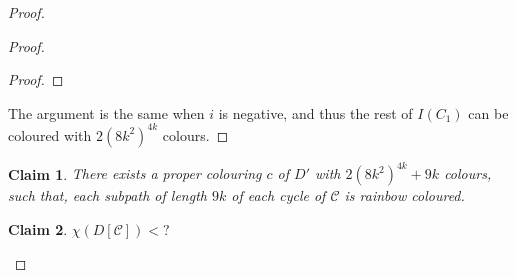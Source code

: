 \documentclass[utf8,10pt]{article}
\theoremstyle{plain}
\newtheorem{claim}{Claim}[theorem]
\theoremstyle{definition}
\theoremstyle{remark}
\begin{document}
\begin{proof}
\begin{proof}
\begin{proof}
\end{proof}
%
%

The argument is the same when $i$ is negative, and thus the rest of $I(C_1)$ can be coloured with $2(8k^2)^{4k}$ colours.
\end{proof}




\begin{claim}
There exists a proper colouring $c$ of $D'$ with $2(8k^2)^{4k} + 9k$ colours, such that, each subpath of length $9k$ of each cycle of $\mathcal{C}$ is rainbow coloured.
\end{claim}






\begin{claim}\label{DC}
$\chi(D[\mathcal{C}]) < ? $
\end{claim}




\end{proof}
\end{document}

